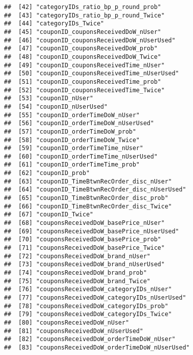 \documentclass[10pt]{report}
\begin{document}
\begin{verbatim}
##  [42] "categoryIDs_ratio_bp_p_round_prob"                  
##  [43] "categoryIDs_ratio_bp_p_round_Twice"                 
##  [44] "categoryIDs_Twice"                                  
##  [45] "couponID_couponsReceivedDoW_nUser"                  
##  [46] "couponID_couponsReceivedDoW_nUserUsed"              
##  [47] "couponID_couponsReceivedDoW_prob"                   
##  [48] "couponID_couponsReceivedDoW_Twice"                  
##  [49] "couponID_couponsReceivedTime_nUser"                 
##  [50] "couponID_couponsReceivedTime_nUserUsed"             
##  [51] "couponID_couponsReceivedTime_prob"                  
##  [52] "couponID_couponsReceivedTime_Twice"                 
##  [53] "couponID_nUser"                                     
##  [54] "couponID_nUserUsed"                                 
##  [55] "couponID_orderTimeDoW_nUser"                        
##  [56] "couponID_orderTimeDoW_nUserUsed"                    
##  [57] "couponID_orderTimeDoW_prob"                         
##  [58] "couponID_orderTimeDoW_Twice"                        
##  [59] "couponID_orderTimeTime_nUser"                       
##  [60] "couponID_orderTimeTime_nUserUsed"                   
##  [61] "couponID_orderTimeTime_prob"                        
##  [62] "couponID_prob"                                      
##  [63] "couponID_TimeBtwnRecOrder_disc_nUser"               
##  [64] "couponID_TimeBtwnRecOrder_disc_nUserUsed"           
##  [65] "couponID_TimeBtwnRecOrder_disc_prob"                
##  [66] "couponID_TimeBtwnRecOrder_disc_Twice"               
##  [67] "couponID_Twice"                                     
##  [68] "couponsReceivedDoW_basePrice_nUser"                 
##  [69] "couponsReceivedDoW_basePrice_nUserUsed"             
##  [70] "couponsReceivedDoW_basePrice_prob"                  
##  [71] "couponsReceivedDoW_basePrice_Twice"                 
##  [72] "couponsReceivedDoW_brand_nUser"                     
##  [73] "couponsReceivedDoW_brand_nUserUsed"                 
##  [74] "couponsReceivedDoW_brand_prob"                      
##  [75] "couponsReceivedDoW_brand_Twice"                     
##  [76] "couponsReceivedDoW_categoryIDs_nUser"               
##  [77] "couponsReceivedDoW_categoryIDs_nUserUsed"           
##  [78] "couponsReceivedDoW_categoryIDs_prob"                
##  [79] "couponsReceivedDoW_categoryIDs_Twice"               
##  [80] "couponsReceivedDoW_nUser"                           
##  [81] "couponsReceivedDoW_nUserUsed"                       
##  [82] "couponsReceivedDoW_orderTimeDoW_nUser"              
##  [83] "couponsReceivedDoW_orderTimeDoW_nUserUsed"          

\end{verbatim}
\end{document}
